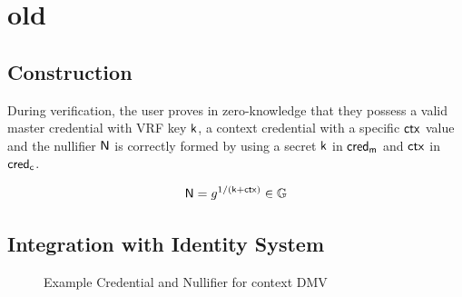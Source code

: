 



\section{old}


\subsection{Construction}
During verification, the user proves in zero-knowledge that they possess a valid master credential with VRF key $\mathsf{k}$, a context credential with a specific $\mathsf{ctx}$ value and the nullifier $\mathsf{N}$ is correctly formed by using a secret $\mathsf{k}$ in $\mathsf{cred_m}$ and $\mathsf{ctx}$ in $\mathsf{cred_c}$. 

\begin{equation}
\mathsf{N} = g^{1/(\mathsf{k} + \mathsf{ctx})} \in \mathbb{G}
\end{equation}

\subsection{Integration with Identity System}


\begin{figure}
        \begin{pchstack}[boxed, center, space=4em]
            \begin{pcvstack}
            \end{pcvstack}
            \pcvspace
            \begin{pcvstack}
            \end{pcvstack}
            \begin{pcvstack}
            \end{pcvstack}
        \end{pchstack}
    \caption{Example Credential and Nullifier for context DMV}
    \label{fig:two-creds}
\end{figure}


